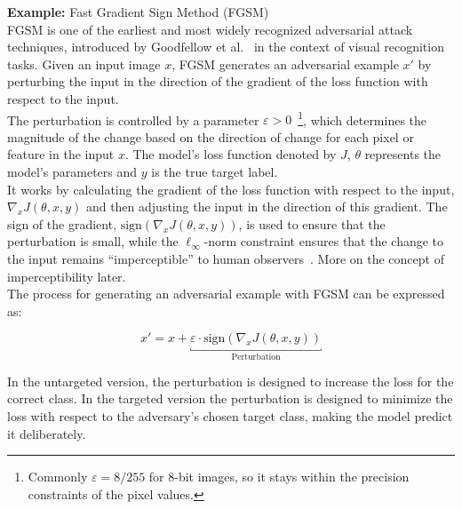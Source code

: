 \documentclass[a4paper, oneside]{discothesis}
\begin{document}
\begin{highlightbox}
	\textbf{Example:} Fast Gradient Sign Method (FGSM) \\

	FGSM is one of the earliest and most widely recognized adversarial attack techniques, introduced by Goodfellow et al.~\cite{goodfellow2014explaining} in the context of visual recognition tasks. Given an input image $x$, FGSM generates an adversarial example $x'$ by perturbing the input in the direction of the gradient of the loss function with respect to the input.\\

	The perturbation is controlled by a parameter $\varepsilon > 0$~\footnote{Commonly $\varepsilon = 8/255$ for 8-bit images, so it stays within the precision constraints of the pixel values.}, which determines the magnitude of the change based on the direction of change for each pixel or feature in the input $x$. The model's loss function denoted by $J$, $\theta$ represents the model's parameters and $y$ is the true target label. \\
	
	It works by calculating the gradient of the loss function with respect to the input, $\nabla_x J(\theta, x, y)$ and then adjusting the input in the direction of this gradient. The sign of the gradient, $\text{sign}(\nabla_x J(\theta, x, y))$, is used to ensure that the perturbation is small, while the $\ell_\infty$-norm constraint ensures that the change to the input remains ``imperceptible'' to human observers~\cite{goodfellow2014explaining, zhang2019adversarial}. More on the concept of imperceptibility later.\\
	
	The process for generating an adversarial example with FGSM can be expressed as:
	
	$$x' = x + \underbracket{\varepsilon \cdot \text{sign}(\nabla_x J(\theta, x, y))}_{\text{Perturbation}}$$
	
	In the untargeted version, the perturbation is designed to increase the loss for the correct class. In the targeted version the perturbation is designed to minimize the loss with respect to the adversary's chosen target class, making the model predict it deliberately.
\end{highlightbox}
\end{document}
